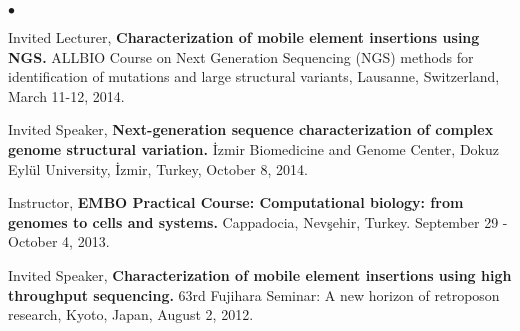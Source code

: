 \documentclass[margin,line]{res}
\newenvironment{list2}{
  \begin{list}{$\bullet$}{%
      \setlength{\itemsep}{0.1cm}
      \setlength{\parsep}{0in} \setlength{\parskip}{0in}
      \setlength{\topsep}{0in} \setlength{\partopsep}{0in} 
      \setlength{\leftmargin}{0.2in}}}{\end{list}}
\newcommand{\junk}[1]{}
\begin{document}
\begin{resume}
\begin{list2}
{\item
  Invited Lecturer, 
  {\bf Characterization of mobile element insertions using NGS.}
  ALLBIO Course on Next Generation Sequencing (NGS) methods for identification of mutations and large structural variants,
  Lausanne, Switzerland, March 11-12, 2014.
\item
  Invited Speaker, 
  {\bf  Next-generation sequence characterization of complex genome structural variation.}
  İzmir Biomedicine and Genome Center, Dokuz Eylül University, İzmir, Turkey, October 8, 2014.
}

\item 
  Instructor,
  {\bf EMBO Practical Course: Computational biology: from genomes to cells and systems.}
  Cappadocia, Nevşehir, Turkey. September 29 - October 4, 2013.
 
 
\junk{
  \item
  Invited Speaker, 
  {\bf  Next-generation sequence characterization of complex genome structural variation.}
  Sabancı University, Tuzla, İstanbul, Turkey. April 17, 2013.
\item
  Invited Speaker, 
  {\bf Yeni nesil dizileme ile karmaşık genom yapısal farklılıkların karakterizasyonu.} {\it (in Turkish)},
  MBG Weekend Seminars VIII, Boğaziçi University, March 23, 2013.  
\item
  Invited Speaker, 
  {\bf Genetik Hastalıkların Keşfinde Yüksek Ölçekli Dizileme ve Biyoinformatik.} {\it (in Turkish)},
  10$^{th}$ National Medical Genetics Congress, Bursa, Turkey,  December 20, 2012.
\item
  Invited Speaker, 
  {\bf  Next-generation sequence characterization of complex genome structural variation.}
  Swiss Institute of Allergy and Asthma Research (SIAF), Davos, Switzerland, September 3, 2012.
  }
  

\item
  Invited Speaker, 
  {\bf Characterization of mobile element insertions using high throughput sequencing.}
  63rd Fujihara Seminar: A new horizon of retroposon research, Kyoto, Japan, August 2, 2012.
  
\junk{
\item
  Invited Speaker, 
  {\bf  Next-generation sequence characterization of complex genome structural variation.}
  School of Medicine, Ko\c{c} University, \.{I}stanbul, Turkey, May 21, 2012.
\item
  Invited Speaker, 
  {\bf  Next-generation sequence characterization of complex genome structural variation.}
  Department of Molecular Biology and Genetics, Bilkent University, Ankara, Turkey, March 14, 2012.
\item
  Invited Speaker,
  {\bf Initial analysis results of the Turkish Genome Project.} 
Bo\u{g}azi\c{c}i University, \.{I}stanbul, Turkey, January 20-21, 2012.

}
\end{list2}
\end{resume}
\end{document}

